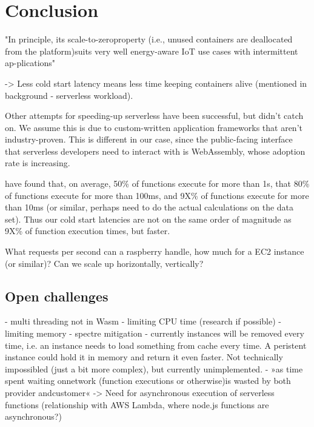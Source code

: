 \chapter{Conclusion}
\label{chapter:conclusion}

"In principle, its scale-to-zeroproperty (i.e., unused containers are deallocated from the platform)suits very well energy-aware IoT use cases with intermittent ap-plications" \cite{Aslanpour2021}

-> Less cold start latency means less time keeping containers alive (mentioned in background - serverless workload).

Other attempts for speeding-up serverless have been successful, but didn't catch on. We assume this is due to custom-written application frameworks that aren't industry-proven. This is different in our case, since the public-facing interface that serverless developers need to interact with is WebAssembly, whose adoption rate is increasing.

\citeauthor{Shahrad2020} have found that, on average, 50\% of functions execute for more than 1s, that 80\% of functions execute for more than 100ms, and 9X\% of functions execute for more than 10ms (or similar, perhaps need to do the actual calculations on the data set). Thus our cold start latencies are not on the same order of magnitude as 9X\% of function execution times, but faster.

What requests per second can a raspberry handle, how much for a EC2 instance (or similar)? Can we scale up horizontally, vertically?

\section{Open challenges}

- multi threading not in Wasm
- limiting CPU time (research if possible)
- limiting memory
- spectre mitigation
- currently instances will be removed every time, i.e. an instance needs to load something from cache every time. A peristent instance could hold it in memory and return it even faster. Not technically impossibled (just a bit more complex), but currently unimplemented.
- »as ​​time ​​spent ​​waiting on ​​network ​​(function ​​executions ​​or ​​otherwise)is ​​wasted ​​by ​​both ​​provider ​and ​customer« \citeauthor{Fox2017} -> Need for asynchronous execution of serverless functions (relationship with AWS Lambda, where node.js functions are asynchronous?)
